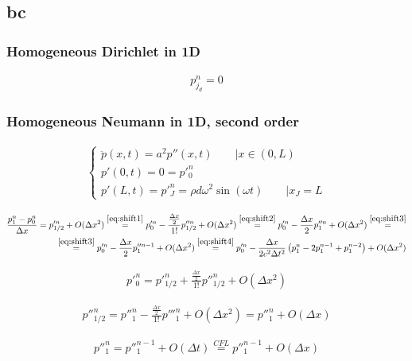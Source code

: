 \documentclass{article}
\numberwithin{equation}{section}
\begin{document}
\subsection{bc}
\subsubsection{Homogeneous Dirichlet in 1D}
\begin{align}
	p^n_{j_d} = 0
\end{align}

\subsubsection{Homogeneous Neumann in 1D, second order}
\begin{align}
	\left\{ \begin{matrix} \ddot p (x,t) = a^2 p''(x,t) \qquad | x \in (0,L) \\ p'(0,t)=0=p'^n_0 \\ p'(L,t)=p'^n_J = \rho d \omega^2 \sin \left( \omega t \right) \qquad | x_J=L \end{matrix} \right.
\end{align}

\begin{align}
	\frac{p^n_1 - p^n_0}{\Delta x} = p'^n_{1/2} + O(\Delta x^2) \overset{\ref{eq:shift1}}{=} p'^n_0 - \frac{\frac{\Delta x}{2}}{1!}p''^n_{1/2}+O(\Delta x^2) \overset{\ref{eq:shift2}}{=} p'^n_0 - \frac{\Delta x}{2}p''^n_{1}+O(\Delta x^2) \overset{\ref{eq:shift3}}{=} \nonumber \\ \overset{\ref{eq:shift3}}{=}  p'^n_0 - \frac{\Delta x}{2}p''^{n-1}_{1}+O(\Delta x^2)\overset{\ref{eq:shift4}}{=} p'^n_0 - \frac{\Delta x}{2c^2\Delta t^2}\left( p^n_1-2p^{n-1}_1+p^{n-2}_1 \right)+O(\Delta x^2)
\end{align}

\begin{align}\label{eq:shift1}
	p'^n_0=p'^n_{1/2} + \frac{\frac{\Delta x}{2}}{1!}p''^n_{1/2}+O(\Delta x^2)
\end{align}

\begin{align}\label{eq:shift2}
	p''^n_{1/2} = p''^n_1 - \frac{\frac{\Delta x}{2}}{1!}p'''^n_1 + O(\Delta x^2) = p''^n_1 + O(\Delta x) 
\end{align}

\begin{align}\label{eq:shift3}
	p''^n_{1} = p''^{n-1}_1 + O(\Delta t) \overset{CFL}{=} p''^{n-1}_1 + O(\Delta x) 
\end{align}
\end{document}
